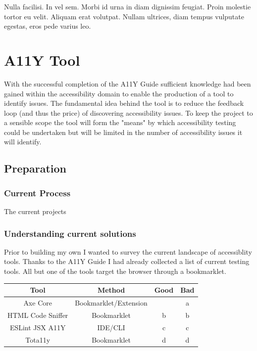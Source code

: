 \begin{savequote}[75mm]
Nulla facilisi. In vel sem. Morbi id urna in diam dignissim feugiat. Proin molestie tortor eu velit. Aliquam erat volutpat. Nullam ultrices, diam tempus vulputate egestas, eros pede varius leo.
\end{savequote}

\chapter{A11Y Tool}
With the successful completion of the A11Y Guide sufficient knowledge had
been gained within the accessibility domain to enable the production of a
tool to identify issues. The fundamental idea behind the tool is to reduce
the feedback loop (and thus the price) of discovering accessibility issues. To
keep the project to a sensible scope the tool will form the "means" by which
accessibility testing could be undertaken but will be limited in the number
of accessibility issues it will identify.

\section{Preparation}
\subsection{Current Process}
The current projects

\subsection{Understanding current solutions}
Prior to building my own I wanted to survey the current landscape of
accessiblity tools. Thanks to the A11Y Guide I had already collected a list of
current testing tools. All but one of the tools target the browser through a
bookmarklet.

\begin{table}[h!]
\centering
\begin{tabular}{ |c|c|c|c| }
 \hline
 Tool & Method & Good & Bad  \\
 \hline
 \hline
 Axe Core & Bookmarklet/Extension &  & a \\
 \hline
 HTML Code Sniffer & Bookmarklet & b & b \\
 \hline
 ESLint JSX A11Y & IDE/CLI & c & c \\
 \hline
 Tota11y & Bookmarklet & d & d \\
 \hline
\end{tabular}
\end{table}

